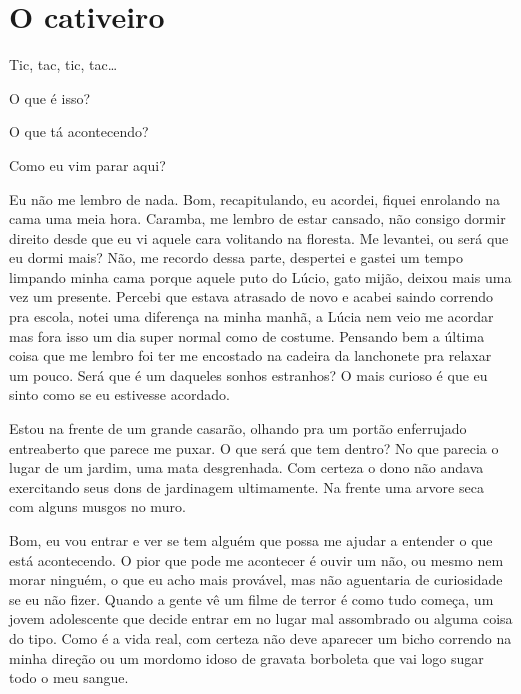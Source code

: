 
\chapter{O cativeiro}

Tic, tac, tic, tac…

O que é isso?

O que tá acontecendo?

Como eu vim parar aqui?


Eu não me lembro de nada. Bom, recapitulando, eu acordei, fiquei enrolando na cama uma meia hora. Caramba, me lembro de estar cansado, não consigo dormir direito desde que eu vi aquele cara volitando na floresta. Me levantei, ou será que eu dormi mais? Não, me recordo dessa parte, despertei e gastei um tempo limpando minha cama porque aquele puto do Lúcio, gato mijão, deixou mais uma vez um presente. Percebi que estava atrasado de novo e acabei saindo correndo pra escola, notei uma diferença na minha manhã, a Lúcia nem veio me acordar mas fora isso um dia super normal como de costume. Pensando bem a última coisa que me lembro foi ter me encostado na cadeira da lanchonete pra relaxar um pouco. Será que é um daqueles sonhos estranhos? O mais curioso é que eu sinto como se eu estivesse acordado.

Estou na frente de um grande casarão, olhando pra um portão enferrujado entreaberto que parece me puxar. O que será que tem dentro? No que parecia o lugar de um jardim, uma mata desgrenhada. Com certeza o dono não andava exercitando seus dons de jardinagem ultimamente. Na frente uma arvore seca com alguns musgos no muro.

Bom, eu vou entrar e ver se tem alguém que possa me ajudar a entender o que está acontecendo. O pior que pode me acontecer é ouvir um não, ou mesmo nem morar ninguém, o que eu acho mais provável, mas não aguentaria de curiosidade se eu não fizer. Quando a gente vê um filme de terror é como tudo começa, um jovem adolescente que decide entrar em no lugar mal assombrado ou alguma coisa do tipo. Como é a vida real, com certeza não deve aparecer um bicho correndo na minha direção ou um mordomo idoso de gravata borboleta que vai logo sugar todo o meu sangue.

